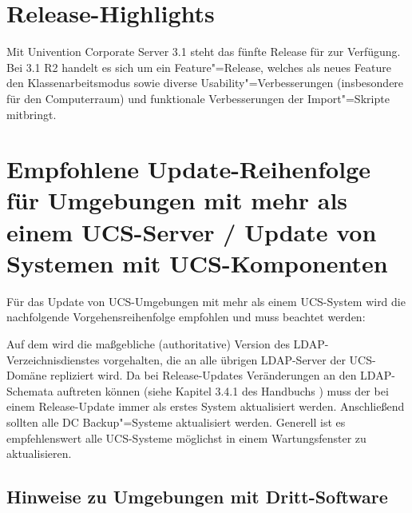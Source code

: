 


\newcommand{\ucsManualTitle}{UCS@school 3.1 R2 Release Notes}
\newcommand{\ucsManualSubtitle}{Release Notes für die Inbetriebnahme und
Aktualisierung von \ucsUAS{} 3.1 R2}
\newcommand{\ucsManualVersion}{3.1}
\newcommand{\ucsTechAuthor}{ & Univention GmbH & feedback@univention.de}
\newcommand{\ucsSVNVersion}{41186}

\setcounter{secnumdepth}{3}
\setcounter{tocdepth}{3}



\chapter{Release-Highlights}

Mit Univention Corporate Server 3.1 steht das fünfte Release für
\ucsUAS{} zur Verfügung. Bei \ucsUAS{} 3.1 R2 handelt es sich um ein Feature"=Release, welches als neues
Feature den Klassenarbeitsmodus sowie diverse Usability"=Verbesserungen (insbesondere für den Computerraum) und
funktionale Verbesserungen der Import"=Skripte mitbringt.

\chapter{Empfohlene Update-Reihenfolge für Umgebungen mit mehr als einem UCS-Server / Update von Systemen mit UCS-Komponenten}

Für das Update von UCS-Umgebungen mit mehr als einem UCS-System wird
die nachfolgende Vorgehensreihenfolge empfohlen und muss beachtet werden:

Auf dem \ucsMaster{} wird die maßgebliche (authoritative) Version des
LDAP-Verzeichnisdienstes vorgehalten, die an alle übrigen LDAP-Server
der UCS-Domäne repliziert wird. Da bei Release-Updates Veränderungen
an den LDAP-Schemata auftreten können (siehe
Kapitel 3.4.1 des Handbuchs \cite{UCS-Handbuch}) muss der \ucsMaster{} bei einem
Release-Update immer als erstes System aktualisiert werden. Anschließend sollten alle DC Backup"=Systeme
aktualisiert werden. Generell ist es empfehlenswert alle UCS-Systeme möglichst in einem
Wartungsfenster zu aktualisieren. 

\section{Hinweise zu Umgebungen mit Dritt-Software}


